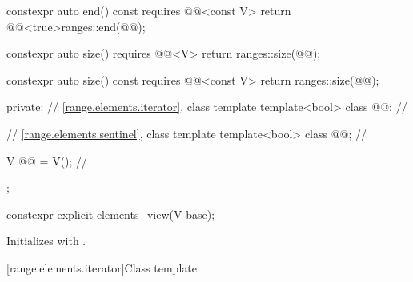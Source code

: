\begin{codeblock}
{{    constexpr auto end() const requires @@<const V>
    { return @@<true>{ranges::end(@@)}; }

    constexpr auto size() requires @@<V>
    { return ranges::size(@@); }

    constexpr auto size() const requires @@<const V>
    { return ranges::size(@@); }

  private:
    // \ref{range.elements.iterator}, class template 
    template<bool> class @@;                      // \expos

    // \ref{range.elements.sentinel}, class template 
    template<bool> class @@;                      // \expos

    V @@ = V();                                      // \expos
  };
}
\end{codeblock}

%
\begin{itemdecl}
constexpr explicit elements_view(V base);
\end{itemdecl}

\begin{itemdescr}
\pnum
\effects
Initializes  with .
\end{itemdescr}

[range.elements.iterator]{Class template }

